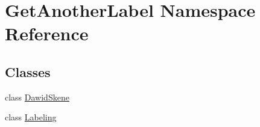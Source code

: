 \hypertarget{namespace_get_another_label}{}\section{Get\+Another\+Label Namespace Reference}
\label{namespace_get_another_label}
\subsection*{Classes}
\begin{DoxyCompactItemize}
\item 
class \hyperlink{class_get_another_label_1_1_dawid_skene}{Dawid\+Skene}
\item 
class \hyperlink{class_get_another_label_1_1_labeling}{Labeling}
\end{DoxyCompactItemize}
